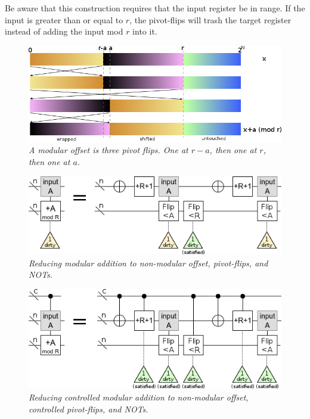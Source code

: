 \documentclass[twocolumn]{article}
\begin{document}
Be aware that this construction requires that the input register be in range.
If the input is greater than or equal to $r$, the pivot-flips will trash the target register instead of adding the input mod $r$ into it.

\begin{figure}
  \centering
  \includegraphics[width=\linewidth]{assets/mod-add-from-pivot-flip-bars.png}
  \caption{\em
     A modular offset is three pivot flips.
     One at $r-a$, then one at $r$, then one at $a$.
   }
  \label{fig:modular-add}
\end{figure}

\begin{figure}
  \centering
  \includegraphics[width=\linewidth]{assets/modular-addition.png}
  \caption{\em Reducing modular addition to non-modular offset, pivot-flips, and NOTs.}
  \label{fig:modular-add}
\end{figure}

\begin{figure}
  \centering
  \includegraphics[width=\linewidth]{assets/controlled-modular-addition.png}
  \caption{\em Reducing controlled modular addition to non-modular offset, controlled pivot-flips, and NOTs.}
  \label{fig:modular-add}
\end{figure}
\end{document}
